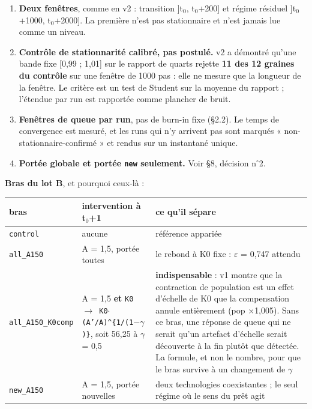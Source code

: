 \documentclass[11pt,a4paper]{article}
\newcommand{\code}[1]{\texttt{#1}}
\providecommand{\degree}{\ensuremath{^\circ}}
\begin{document}
\begin{enumerate}
\item \textbf{Deux fenêtres}, comme en v2 : transition ]t\ensuremath{_0}, t\ensuremath{_0}+200] et régime résiduel ]t\ensuremath{_0}+1000, t\ensuremath{_0}+2000]. La première n'est pas stationnaire et n'est jamais lue comme un niveau.
\item \textbf{Contrôle de stationnarité calibré, pas postulé.} v2 a démontré qu'une bande fixe [0,99 ; 1,01] sur le rapport de quarts rejette \textbf{11 des 12 graines du contrôle} sur une fenêtre de 1000 pas : elle ne mesure que la longueur de la fenêtre. Le critère est un test de Student sur la moyenne du rapport ; l'étendue par run est rapportée comme plancher de bruit.
\item \textbf{Fenêtres de queue par run}, pas de burn-in fixe (§2.2). Le temps de convergence est mesuré, et les runs qui n'y arrivent pas sont marqués « non-stationnaire-confirmé » et rendus sur un instantané unique.
\item \textbf{Portée globale et portée \code{new} seulement.} Voir §8, décision n\degree{}2.
\end{enumerate}

\textbf{Bras du lot B}, et pourquoi ceux-là :

\begin{center}
\begin{tabularx}{\linewidth}{@{}lXX@{}}
\toprule
\textbf{bras} & \textbf{intervention à t\ensuremath{_0}+1} & \textbf{ce qu'il sépare} \\
\midrule
\code{control} & aucune & référence appariée \\
\code{all\_A150} & A = 1,5, portée toutes & le rebond à K0 fixe : \ensuremath{\varepsilon} = 0,747 attendu \\
\code{all\_A150\_K0comp} & A = 1,5 \textbf{et} \code{K0 \ensuremath{\rightarrow} K0\ensuremath{\cdot}(A'/A)\textasciicircum{}\{1/(1\ensuremath{-}\ensuremath{\gamma})\}}, soit 56,25 à \ensuremath{\gamma} = 0,5 & \textbf{indispensable} : v1 montre que la contraction de population est un effet d'échelle de K0 que la compensation annule entièrement (pop \ensuremath{\times}1,005). Sans ce bras, une réponse de queue qui ne serait qu'un artefact d'échelle serait découverte à la fin plutôt que détectée. La formule, et non le nombre, pour que le bras survive à un changement de \ensuremath{\gamma} \\
\code{new\_A150} & A = 1,5, portée nouvelles & deux technologies coexistantes ; le seul régime où le sens du prêt agit \\
\bottomrule
\end{tabularx}
\end{center}
\end{document}
